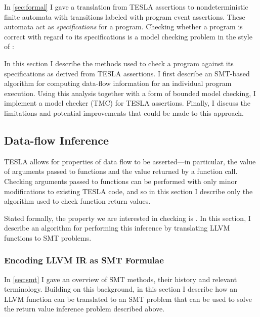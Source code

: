 In \autoref{sec:formal} I gave a translation from TESLA assertions to
nondeterministic finite automata with transitions labeled with program event
assertions. These automata act as \emph{specifications} for a program. Checking
whether a program is correct with regard to its specifications is a model
checking problem in the style of \citeauthor{clarke_design_1982}: 

In this section I describe the methods used to check a program against its
specifications as derived from TESLA assertions. I first describe an SMT-based
algorithm for computing data-flow information for an individual program
execution. Using this analysis together with a form of bounded model checking, I
implement a model checker (TMC) for TESLA assertions. Finally, I discuss the
limitations and potential improvements that could be made to this approach. 

\subsection{Data-flow Inference} \label{sec:rvc}

TESLA allows for properties of data flow to be asserted---in particular, the
value of arguments passed to functions and the value returned by a function
call. Checking arguments passed to functions can be performed with only minor
modifications to existing TESLA code, and so in this section I describe only the
algorithm used to check function return values.

Stated formally, the property we are interested in checking is
. In this section, I describe an algorithm
for performing this inference by translating LLVM functions to SMT
problems.

\subsubsection{Encoding LLVM IR as SMT Formulae}

In \autoref{sec:smt} I gave an overview of SMT methods, their history
and relevant terminology. Building on this background, in this section I
describe how an LLVM function can be translated to an SMT problem that
can be used to solve the return value inference problem described above.

